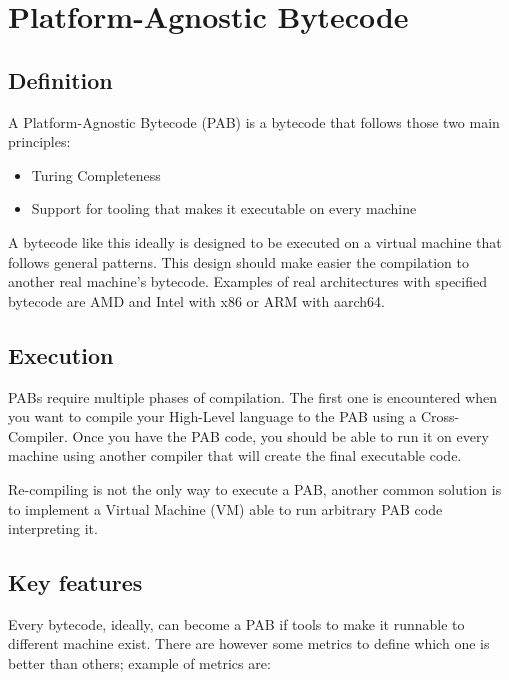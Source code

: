 \documentclass[../main.tex]{subfiles}
\begin{document}
\section{Platform-Agnostic Bytecode}
\subsection{Definition}

A Platform-Agnostic Bytecode (PAB) is
a bytecode that follows those two main principles:

\begin{itemize}
    \item Turing Completeness
    \item Support for tooling that makes it executable on every machine
\end{itemize}

A bytecode like this ideally is designed to be executed on a virtual machine that follows general patterns. This design should make easier the compilation to another real machine's bytecode. Examples of real architectures with specified bytecode are AMD and Intel with x86 or ARM with aarch64. %

\subsection{Execution}

PABs require multiple phases of compilation. The first one is encountered when you want to compile your High-Level language to the PAB using a Cross-Compiler. Once you have the PAB code, you should be able to run it on every machine using another compiler that will create the final executable code.

Re-compiling is not the only way to execute a PAB, another common solution is to implement a Virtual Machine (VM) able to run arbitrary PAB code interpreting it.

\subsection{Key features}

Every bytecode, ideally, can become a PAB if tools to make it runnable to different machine exist. There are however some metrics to define which one is better than others; example of metrics are:
\end{document}
